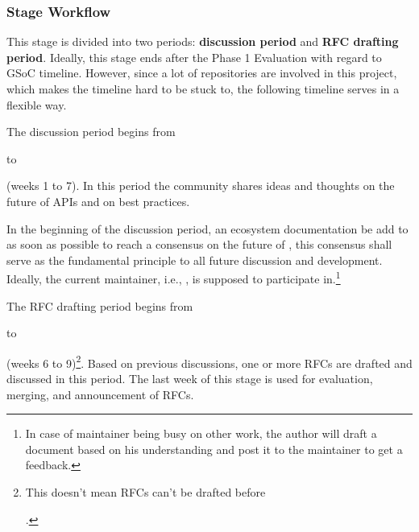 \subsubsection*{Stage Workflow}

This stage is divided into two periods: \textbf{discussion period} and \textbf{RFC drafting period}. Ideally, this stage ends after the \textsf{Phase 1 Evaluation} with regard to GSoC timeline. However, since a lot of repositories are involved in this project, which makes the timeline hard to be stuck to, the following timeline serves in a flexible way.\par

The discussion period begins from \date{April 22} to \date{June 9} (weeks 1 to 7). In this period the community shares ideas and thoughts on the future of APIs and on best practices.\par

In the beginning of the discussion period, an ecosystem documentation be add to \repoimagesgithubio{} as soon as possible to reach a consensus on the future of \images{}, this consensus shall serve as the fundamental principle to all future discussion and development. Ideally, the current \images{} maintainer, i.e., \timholy, is supposed to participate in.\footnote{In case of maintainer being busy on other work, the author will draft a document based on his understanding and post it to the maintainer to get a feedback.}\par

The RFC drafting period begins from \date{May 27} to \date{June 23} (weeks 6 to 9)\footnote{This doesn't mean RFCs can't be drafted before \date{May 27}.}. Based on previous discussions, one or more RFCs are drafted and discussed in this period. The last week of this stage is used for evaluation, merging, and announcement of RFCs.\par

